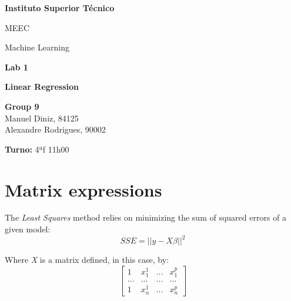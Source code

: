 \documentclass[a4paper,2pt]{report}
\begin{document}
\begin{titlepage}
    \begin{center}
        \vspace*{3cm}
 
        \LARGE
        \textbf{Instituto Superior Técnico}
        \vskip 0.4cm
 
        \Large{MEEC}
        \vskip 0.2cm

        \Large{Machine Learning}
        \vskip 3cm
        

 
        \Huge{\textbf{Lab 1}}
        \vskip 0.5cm

        \huge{\textbf{Linear Regression}}
        \vskip 0.5cm

 
        \vfill
 
        \large
        \textbf{Group 9}\\
        \vspace{0.3cm}
        Manuel Diniz, 84125\\
        Alexandre Rodrigues, 90002\\
        
        \vspace{1cm}

        \textbf{Turno:} 4ªf 11h00

    \end{center}
\end{titlepage}

\tableofcontents
\newpage

\setcounter{chapter}{1}
\section{Matrix expressions}

    \par The \textit{Least Squares} method relies on minimizing the sum of squared errors of a given model:
    \begin{equation}
        \textit{SSE} = ||y - X\beta||^2
    \end{equation}

    \par Where \textit{X} is a matrix defined, in this case, by:
    \begin{equation}
        \begin{bmatrix}
            1 & x_1^1 & \textit{...} & x_1^p\\
            \textit{...} & \textit{...} & \textit{...} & \textit{...}\\
            1 & x_n^1 & \textit{...} & x_n^p
        \end{bmatrix}
    \end{equation}
\end{document}
